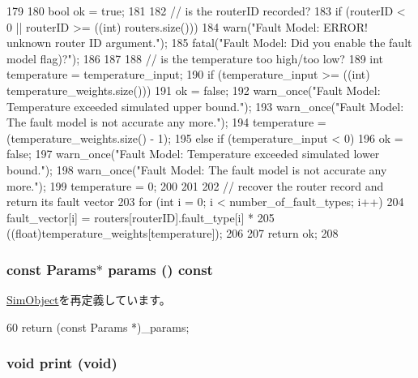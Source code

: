 \begin{DoxyCode}
179 {
180     bool ok = true;
181 
182     // is the routerID recorded?
183     if (routerID < 0 || routerID >= ((int) routers.size())){
184          warn("Fault Model: ERROR! unknown router ID argument.");
185         fatal("Fault Model: Did you enable the fault model flag)?");     
186     }
187 
188     // is the temperature too high/too low?
189     int temperature = temperature_input;
190     if (temperature_input >= ((int) temperature_weights.size())){
191         ok = false;
192         warn_once("Fault Model: Temperature exceeded simulated upper bound.");
193         warn_once("Fault Model: The fault model is not accurate any more.");
194         temperature = (temperature_weights.size() - 1);
195     } else if (temperature_input < 0){
196         ok = false;
197         warn_once("Fault Model: Temperature exceeded simulated lower bound.");
198         warn_once("Fault Model: The fault model is not accurate any more.");
199         temperature = 0;
200     }
201 
202     // recover the router record and return its fault vector
203     for (int i = 0; i < number_of_fault_types; i++){
204         fault_vector[i] = routers[routerID].fault_type[i] * 
205                           ((float)temperature_weights[temperature]);
206     }
207     return ok;
208 }
\end{DoxyCode}
\hypertarget{classFaultModel_acd3c3feb78ae7a8f88fe0f110a718dff}{
\subsubsection[{params}]{\setlength{\rightskip}{0pt plus 5cm}const {\bf Params}$\ast$ params () const}}
\label{classFaultModel_acd3c3feb78ae7a8f88fe0f110a718dff}


\hyperlink{classSimObject_acd3c3feb78ae7a8f88fe0f110a718dff}{SimObject}を再定義しています。


\begin{DoxyCode}
60 { return (const Params *)_params; }
\end{DoxyCode}
\hypertarget{classFaultModel_a7e8442e7139d840c15bdee83789f7ae8}{
\subsubsection[{print}]{\setlength{\rightskip}{0pt plus 5cm}void print (void)}}
\label{classFaultModel_a7e8442e7139d840c15bdee83789f7ae8}



